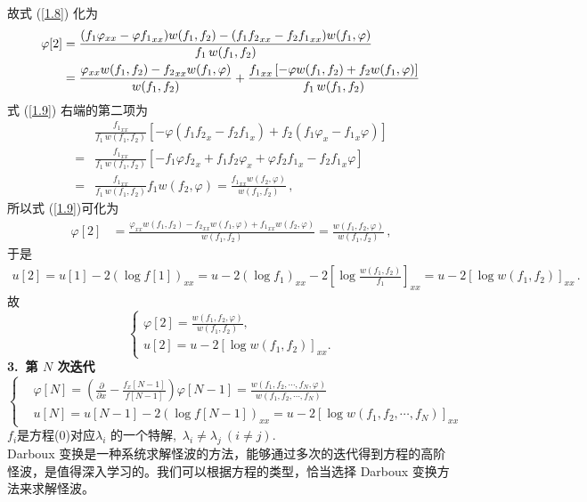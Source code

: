 故式 (\ref{1.8}) 化为
\begin{align}
\varphi[2] &= \frac{(f_1 \varphi_{xx} - \varphi {f_1}_{xx}) w(f_1, f_2) - (f_1 {f_2}_{xx} - f_2 {f_1}_{xx})w(f_1, \varphi)}{f_1\, w(f_1, f_2)} \notag \\
& = \frac{\varphi_{xx} w(f_1, f_2) - {f_2}_{xx} w(f_1, \varphi)}{w(f_1, f_2)} +\frac{ {f_1}_{xx}\,[- \varphi  w(f_1, f_2) + f_2  w(f_1, \varphi)]}{f_1\, w(f_1, f_2)}\,  \label{1.9}
\end{align}
式 (\ref{1.9}) 右端的第二项为
\begin{align*}
&\frac{{f_1}_{xx}}{f_1\, w(f_1, f_2)}[-\varphi(f_1 {f_2}_x - f_2 {f_1}_x) + f_2(f_1 \varphi_x - {f_1}_x \varphi)] \\
=& \frac{{f_1}_{xx}}{f_1\, w(f_1, f_2)}[-f_1 \varphi {f_2}_x + f_1 f_2 \varphi_x + {\varphi f_2 {f_1}_x} - {f_2 {f_1}_x \varphi}] \\
=& \frac{{f_1}_{xx}}{f_1\, w(f_1, f_2)} f_1 w(f_2, \varphi) = \frac{{f_1}_{xx} w(f_2, \varphi)}{ w(f_1, f_2)}\,,
\end{align*}
所以式 (\ref{1.9})可化为
\begin{align*}
\varphi[2] &= \frac{\varphi_{xx} w(f_1, f_2) - {f_2}_{xx} w(f_1, \varphi) + {f_1}_{xx} w(f_2, \varphi)}{w(f_1, f_2)} = \frac{w(f_1, f_2, \varphi)}{w(f_1, f_2)}\,,
\end{align*}
于是
\begin{align*}
u[2] = u[1] - 2(\log f[1])_{xx} = u - 2(\log f_1)_{xx} - 2[\log \frac{w(f_1, f_2)}{f_1}]_{xx} = u - 2[\log w(f_1, f_2)]_{xx}\,.
\end{align*}
故
\begin{equation*}
\begin{cases}
\varphi[2] = \frac{w(f_1, f_2, \varphi)}{w(f_1, f_2)}, \\
u[2] = u - 2[\log w(f_1, f_2)]_{xx}.
\end{cases}
\end{equation*}
\textbf{3.\ 第 $N$ 次迭代}
\begin{equation*}
\left\{
\begin{aligned}
&\varphi[N] = (\frac{\partial}{\partial x} - \frac{f_x[N-1]}{f[N-1]}) \varphi[N-1] = \frac{w(f_1, f_2, \cdots , f_N, \varphi)}{w(f_1, f_2, \cdots, f_N)} \\
&u[N] = u[N-1] - 2(\log f[N -1])_{xx} = u - 2[\log w(f_1, f_2, \cdots , f_N)]_{xx}
\end{aligned}
\right.
\end{equation*}
$f_i$是方程(0)对应$\lambda_i$ 的一个特解,\ $\lambda_i \ne \lambda_j\ (i \ne j)$.\\

Darboux 变换是一种系统求解怪波的方法，能够通过多次的迭代得到方程的高阶怪波，是值得深入学习的。我们可以根据方程的类型，恰当选择 Darboux 变换方法来求解怪波。
